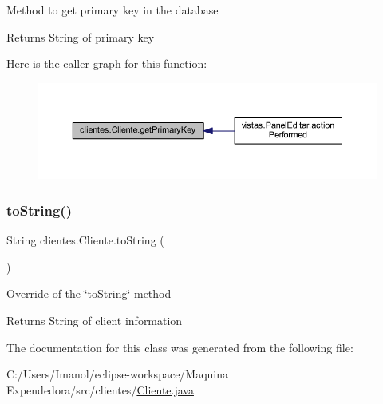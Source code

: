 Method to get primary key in the database

\begin{DoxyReturn}{Returns}
String of primary key 
\end{DoxyReturn}
Here is the caller graph for this function\+:\nopagebreak
\begin{figure}[H]
\begin{center}
\leavevmode
\includegraphics[width=350pt]{classclientes_1_1_cliente_afe1b2756b16dc23224805400ef1125d3_icgraph}
\end{center}
\end{figure}
\mbox{\label{classclientes_1_1_cliente_a1bcd093234a348d3471ab95a1c58fa8c}} 
\subsubsection{\texorpdfstring{to\+String()}{toString()}}
{\footnotesize\ttfamily String clientes.\+Cliente.\+to\+String (\begin{DoxyParamCaption}{ }\end{DoxyParamCaption})}

Override of the \char`\"{}to\+String\char`\"{} method \begin{DoxyReturn}{Returns}
String of client information 
\end{DoxyReturn}


The documentation for this class was generated from the following file\+:\begin{DoxyCompactItemize}
\item 
C\+:/\+Users/\+Imanol/eclipse-\/workspace/\+Maquina Expendedora/src/clientes/\mbox{\hyperlink{_cliente_8java}{Cliente.\+java}}\end{DoxyCompactItemize}
